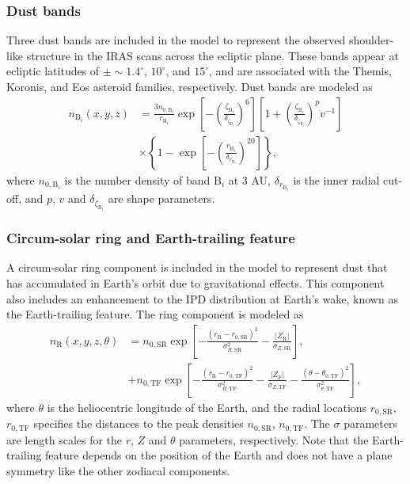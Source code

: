 \documentclass{aa}
\begin{document}
\subsubsection{Dust bands}
Three dust bands are included in the model to represent the observed 
shoulder-like structure in the IRAS scans across the ecliptic plane. 
These bands appear at ecliptic latitudes of 
$\pm \sim 1.4^\circ$, $10^\circ$, and $15^\circ$, and are associated 
with the Themis, Koronis, and Eos asteroid families, respectively. Dust 
bands are modeled as
\begin{align}
    n_{\mathrm{B}_i}(x,y,z) &= \frac{3 n_{0, \mathrm{B}_i}}{r_{\mathrm{B}_i}} \exp \left[-\left(\frac{\zeta_{\mathrm{B}_i}}{\delta_{\zeta_{\mathrm{B}_i}}}\right)^{6}\right]\left[1 + \left(\frac{\zeta_{\mathrm{B}_i}}{\delta_{\zeta_{\mathrm{B}_i}}}\right)^{p}v^{-1}\right] \\
    &\times\left\{1-\exp \left[-\left(\frac{r_{\mathrm{B}_i}}{\delta_{r_{\mathrm{B}_i}}}\right)^{20}\right]\right\},
\end{align}
where $n_{0, \mathrm{B}_i}$ is the number density of band $\mathrm{B}_i$ 
at 3 AU, $\delta_{r_{\mathrm{B}_i}}$ is the inner radial cut-off, and 
$p$, $v$ and $\delta_{\zeta_{\mathrm{B}_i}}$ are shape parameters.
\subsubsection{Circum-solar ring and Earth-trailing feature}
A circum-solar ring component is included in the model to represent dust 
that has accumulated in Earth's orbit due to gravitational effects. This 
component also includes an enhancement to the IPD distribution at 
Earth's wake, known as the Earth-trailing feature. The ring component is 
modeled as
\begin{align}
    n_\mathrm{R}(x, y, z, \theta)&=n_{0, \mathrm{SR}} \exp \left[-\frac{\left(r_\mathrm{R}-r_{0, \mathrm{SR}}\right)^2}{\sigma_{R,\mathrm{SR}} ^2}-\frac{\left| Z_\mathrm{R} \right|}{\sigma_{Z, \mathrm{SR}}}\right],\\
   &+ n_{0, \mathrm{TF}} \exp \left[-\frac{\left(r_\mathrm{R}-r_{0, \mathrm{TF}}\right)^{2}}{\sigma_{R, \mathrm{TF}}^{2}}-\frac{\left|Z_\mathrm{F}\right|}{\sigma_{Z, \mathrm{TF}}}-\frac{\left(\theta-\theta_{0, \mathrm{TF}}\right)^{2}}{\sigma_{\theta,\mathrm{TF}}^{2}}\right],
\end{align}
where $\theta$ is the heliocentric longitude of the Earth, and the 
radial locations $r_{0, \mathrm{SR}}$, $r_{0, \mathrm{TF}}$ specifies 
the distances to the peak densities $n_{0, \mathrm{SR}}$, 
$n_{0, \mathrm{TF}}$. The $\sigma$ parameters are length scales for the 
$r$, $Z$ and $\theta$ parameters, respectively. Note that the 
Earth-trailing feature depends on the position of the Earth and does not 
have a plane symmetry like the other zodiacal components. 
\end{document}
